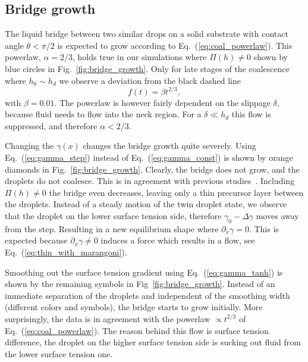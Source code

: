 \documentclass[twocolumn,amsmath,amssymb,showpacs,pre,nofootinbib,superscriptaddress]{revtex4-1} %
\begin{document}
\subsection{Bridge growth}\label{subsec:growth}
The liquid bridge between two similar drops on a solid substrate with contact angle $\theta < \pi/2$ is expected to grow according to Eq.~(\ref{eq:coal_powerlaw}). 
This powerlaw, $\alpha = 2/3$, holds true in our simulations where $\Pi(h) \neq 0$ shown by blue circles in Fig.~\ref{fig:bridge_growth}.
Only for late stages of the coalescence where $h_0 \sim h_d$ we observe a deviation from the black dashed line 
\begin{equation}\label{eq:fit_powerlaw}
    f(t) = \beta t^{2/3},
\end{equation}
with $\beta = 0.01$.
The powerlaw is however fairly dependent on the slippage $\delta$, because fluid needs to flow into the neck region.
For a $\delta \ll h_d$ this flow is suppressed, and therefore $\alpha < 2/3$.
 
Changing the $\gamma(x)$ changes the bridge growth quite severely.
Using Eq.~(\ref{eq:gamma_step}) instead of Eq.~(\ref{eq:gamma_const}) is shown by orange diamonds in Fig.~\ref{fig:bridge_growth}.
Clearly, the bridge does not grow, and the droplets do not coalesce.
This is in agreement with previous studies~\cite{karpitschka2014sharp, doi:10.1021/la500459v, PhysRevLett.109.066103, doi:10.1021/la800630w}. 
Including $\Pi(h) \neq 0$ the bridge even decreases, leaving only a thin precursor layer between the droplets.
Instead of a steady motion of the twin droplet state, we observe that the droplet on the lower surface tension side, therefore $\gamma_0 - \Delta\gamma$ moves away from the step. 
Resulting in a new equilibrium shape where $\partial_x\gamma = 0$.
This is expected because $\partial_x\gamma\neq 0$ induces a force which results in a flow, see Eq.~(\ref{eq:thin_with_marangoni}).

Smoothing out the surface tension gradient using Eq.~(\ref{eq:gamma_tanh}) is shown by the remaining symbols in Fig~\ref{fig:bridge_growth}.
Instead of an immediate separation of the droplets and independent of the smoothing width (different colors and symbols), the bridge starts to grow initially.
More surprisingly, the data is in agreement with the powerlaw $\propto t^{2/3}$ of Eq.~(\ref{eq:coal_powerlaw}).
The reason behind this flow is surface tension difference, the droplet on the higher surface tension side is sucking out fluid from the lower surface tension one.
\end{document}
